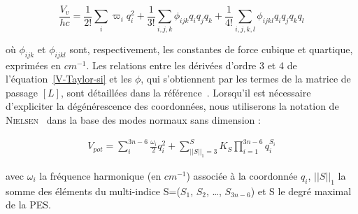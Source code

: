 \documentclass[12pt,a4paper]{book}
\begin{document}
\begin{equation}
\frac{V_v}{hc} = \frac{1}{2!} \sum_i \varpi_i q^2_i + \frac{1}{3!} \sum_{i,j,k} \phi_{ijk}q_i q_j q_k + \frac{1}{4!} \sum_{i,j,k,l} \phi_{ijkl}q_i q_j q_k q_l
\end{equation}

\noindent où $\phi_{ijk}$ et $\phi_{ijkl}$ sont, respectivement, les constantes de force cubique et quartique, exprimées en $cm^{-1}$. Les relations entre les dérivées d'ordre 3 et 4 de l'équation~\ref{V-Taylor-si} et les $\phi$, qui s'obtiennent par les termes de la matrice de passage $[L]$, sont détaillées dans la référence~\cite{hoy1972anharmonic}.
Lorsqu'il est nécessaire d'expliciter la dégénérescence des coordonnées, nous utiliserons la notation de \textsc{Nielsen}~\cite{nielsen1951vibration} dans la base des modes normaux sans dimension :

\begin{align} \label{V-Nielsen}
V_{pot} = \sum_i^{3n-6} \frac{\omega_i}{2} q_i^2 + \sum_{{\vert \vert S \vert \vert}_1 = 3}^{S} K_S \prod_{i=1}^{3n-6} q_i^{S_i}
\end{align}

avec $\omega_i$ la fréquence harmonique (en $cm^{-1}$) associée à la coordonnée $q_i$, ${\vert \vert S \vert \vert}_1$ la somme des éléments du multi-indice S=($S_1$, $S_2$, …, $S_{3n-6}$) et S le degré maximal de la PES. 
\end{document}
